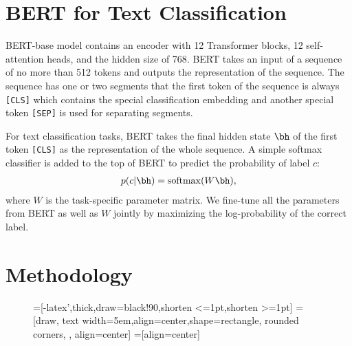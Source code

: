\documentclass[11pt,a4paper]{article}
\theoremstyle{definition}
\begin{document}
\begin{CJK*}{UTF8}{gbsn}
\section{BERT for Text Classification}

BERT-base model contains an encoder with 12 Transformer blocks, 12 self-attention heads, and the hidden size of 768. BERT takes an input of a sequence of no more than 512 tokens and outputs the representation of the sequence. The sequence has one or two segments that the first token of the sequence is always \texttt{[CLS]} which contains the special classification embedding and another special token \texttt{[SEP]} is used for separating segments.
	
For text classification tasks, BERT takes the final hidden state $\bh$ of the first token \texttt{[CLS]} as the representation of the whole sequence. A simple softmax classifier is added to the top of BERT to predict the probability of label $c$:
\begin{align}
p(c|\bh) =\mathrm{softmax}(W\bh),
\end{align}
where $W$ is the task-specific parameter matrix. We fine-tune all the parameters from BERT as well as $W$ jointly by maximizing the log-probability of the correct label.
	
\section{Methodology}

\begin{figure}
  \centering

  =[-latex',thick,draw=black!90,shorten <=1pt,shorten >=1pt]
=[draw, text width=5em,align=center,shape=rectangle, rounded corners, , align=center]
  =[align=center]

\end{figure}
\end{CJK*}
\end{document}
